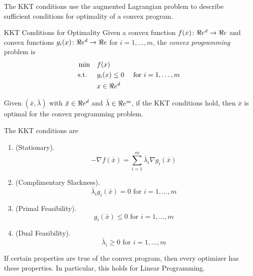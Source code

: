 The KKT conditions use the augmented Lagrangian problem to describe sufficient conditions for optimality of a convex program.  


\begin{general}{KKT Conditions for Optimality}{}
Given a convex function $f(x)\colon \Re e^d \to \Re e$ and convex functions $g_i(x)\colon \Re e^d \to \Re e$ for $i=1, \dots, m$,  the \emph{convex programming} problem is
\begin{equation}
\label{eq:convex-programming-KKT}
\begin{split}
\min \quad & f(x)\\
\mbox{ s.t. }  \quad & g_i(x) \leq 0  \quad  \mbox{ for } i=1, \dots, m\\
& x \in \Re e^d
\end{split}
\end{equation}

Given $(\bar x, \bar \lambda)$ with $\bar x \in \Re e^d$ and $\bar \lambda \in \Re e^m$, if the KKT conditions hold, then $\bar x$ is optimal for the convex programming problem.  

The KKT conditions are
\begin{enumerate}
\item (Stationary).   
\begin{equation}
- \nabla f(\bar x) = \sum_{i=1}^m \bar \lambda_i \nabla g_i(\bar x)
\end{equation}
\item (Complimentary Slackness).   
\begin{equation}
 \bar \lambda_i  g_i(\bar x) = 0 \text{ for } i=1, \dots, m
\end{equation}
\item (Primal Feasibility).   
\begin{equation}
  g_i(\bar x) \leq 0 \text{ for } i=1, \dots, m
\end{equation}
\item (Dual Feasibility).   
\begin{equation}
 \bar \lambda_i \geq 0 \text{ for } i=1, \dots, m
\end{equation}
\end{enumerate}
\end{general}

If certain properties are true of the convex program, then every optimizer has these properties.   In particular, this holds for Linear Programming.



\begin{minipage}{0.5\textwidth}
\end{minipage}
\begin{minipage}{0.5\textwidth}
\end{minipage}







